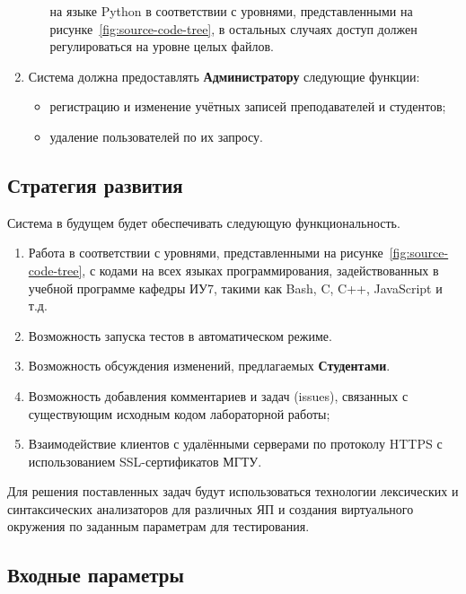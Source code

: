 \documentclass{bmstu}
\begin{document}
\begin{enumerate}[label*=\arabic*.]
\begin{itemize}[label=---]
    	  на языке Python в соответствии с уровнями, представленными на
    	  рисунке~\ref{fig:source-code-tree}, в остальных случаях доступ должен
    	  регулироваться на уровне целых файлов.
    \end{itemize}
    \item Система должна предоставлять \textbf{Администратору} следующие
      функции:
    \begin{itemize}[label=---]
    	\item регистрацию и изменение учётных записей преподавателей и студентов;
    	\item удаление пользователей по их запросу.
    \end{itemize}
  \end{enumerate}

  \subsection{Стратегия развития}

  Система в будущем будет обеспечивать следующую функциональность.
  \begin{enumerate}[label*=\arabic*.]
    \item Работа в соответствии с уровнями, представленными на
      рисунке~\ref{fig:source-code-tree}, с кодами на всех языках
      программирования, задействованных в учебной программе кафедры
      ИУ7, такими как Bash, C, C++, JavaScript и т.д.
    \item Возможность запуска тестов в автоматическом режиме.
    \item Возможность обсуждения изменений, предлагаемых \textbf{Студентами}.
    \item Возможность добавления комментариев и задач (issues),
      связанных с существующим исходным кодом лабораторной работы;
    \item Взаимодействие клиентов с удалёнными серверами по протоколу
    HTTPS с использованием SSL-сертификатов МГТУ.
  \end{enumerate}

  Для решения поставленных задач будут использоваться технологии лексических
  и синтаксических анализаторов для различных ЯП и создания виртуального окружения
  по заданным параметрам для тестирования. 

  \subsection{Входные параметры}
\end{document}
